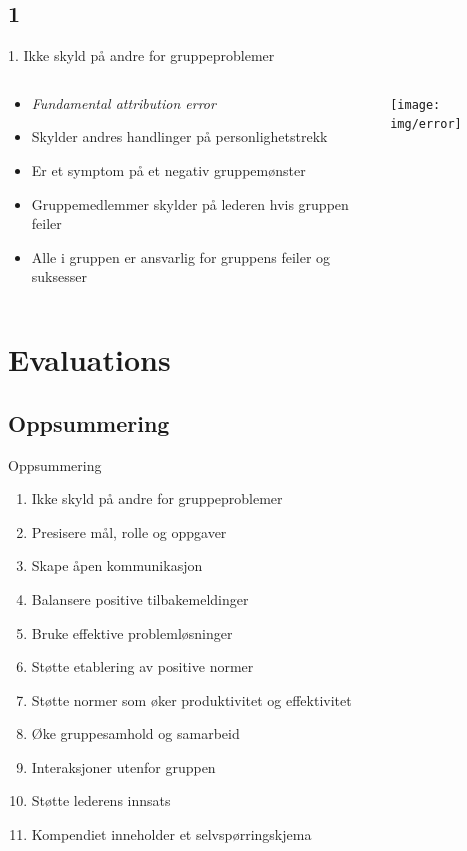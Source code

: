 \documentclass[screen, compress]{beamer}
\begin{document}
\subsection{1}
\begin{frame}{1. Ikke skyld på andre for gruppeproblemer}
\begin{columns}
\begin{column}[l]{6cm}
\begin{itemize}
	\item \emph{Fundamental attribution error}
	\item Skylder andres handlinger på personlighetstrekk
	\item Er et symptom på et negativ gruppemønster
	\item Gruppemedlemmer skylder på lederen hvis gruppen feiler
	\item Alle i gruppen er ansvarlig for gruppens feiler og suksesser
\end{itemize}
\end{column}
\begin{column}[r]{4cm}
	\texttt{[image: img/error]}
\end{column}
\end{columns}
\end{frame}


\section{Evaluations}

\subsection{Oppsummering}
\begin{frame}{Oppsummering}
\begin{enumerate}
	\item Ikke skyld på andre for gruppeproblemer
	\item Presisere mål, rolle og oppgaver
	\item Skape åpen kommunikasjon
	\item Balansere positive tilbakemeldinger
	\item Bruke effektive problemløsninger
	\item Støtte etablering av positive normer
	\item Støtte normer som øker produktivitet og effektivitet
	\item Øke gruppesamhold og samarbeid
	\item Interaksjoner utenfor gruppen
	\item Støtte lederens innsats
	\item Kompendiet inneholder et selvspørringskjema
\end{enumerate}
\end{frame}
\end{document}
